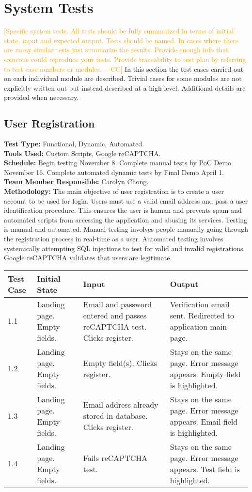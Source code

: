 \documentclass[12pt]{article}
\newcommand{\authornote}[3]{\textcolor{#1}{[#3 ---#2]}}
\newcommand{\authornote}[3]{}
\newcommand{\cc}[1]{\authornote{orange}{CC}{#1}}
\begin{document}
\section{System Tests}
\cc{Specific system tests.  All tests should be fully summarized in terms of initial state, input and expected output. Tests should be named. In cases where there are many similar tests just summarize the results. Provide enough info that someone could reproduce your tests. Provide traceability to test plan by referring to test case numbers or modules.} In this section the test cases carried out on each individual module are described. Trivial cases for some modules are not explicitly written out but instead described at a high level. Additional details are provided when necessary.

\subsection{User Registration} 
\textbf{Test Type:} Functional, Dynamic, Automated. \\
\textbf{Tools Used:} Custom Scripts, Google reCAPTCHA. \\
\textbf{Schedule:} Begin testing November 8. Complete manual tests by PoC Demo November 16. Complete automated dynamic tests by Final Demo April 1. \\
\textbf{Team Member Responsible:} Carolyn Chong.\\
\textbf{Methodology:} The main objective of user registration is to create a user account to be used for login. Users must use a valid email address and pass a user identification procedure. This ensures the user is human and prevents spam and automated scripts from accessing the application and abusing its services. Testing is manual and automated. Manual testing involves people manually going through the registration process in real-time as a user. Automated testing involves systemically attempting SQL injections to test for valid and invalid registrations. Google reCAPTCHA validates that users are legitimate.

\begin{longtable}{|p{2cm}|p{3cm}|p{5cm}|p{5cm}|}
\hline
\textbf{Test Case}  & \textbf{Initial State} & \textbf{Input} & \textbf{Output} \\ \hline
1.1 & Landing page. Empty fields. & Email and password entered and passes reCAPTCHA test. Clicks register. & Verification email sent. Redirected to application main page. \\ 
\hline
1.2 & Landing page. Empty fields. & Empty field(s). Clicks register. & Stays on the same page. Error message appears. Empty field is highlighted. \\
\hline
1.3 & Landing page. Empty fields. & Email address already stored in database. Clicks register. & Stays on the same page. Error message appears. Email field is highlighted. \\
\hline
1.4 & Landing page. Empty fields. & Fails reCAPTCHA test. & Stays on the same page. Error message appears. Test field is highlighted. \\
\hline
\end{longtable}
\end{document}
